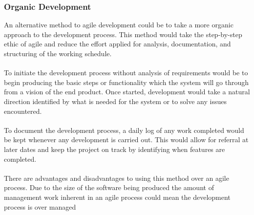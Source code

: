 		\subsubsection{Organic Development}
			An alternative method to agile development could be to take a more organic approach to the development process. This method would take the step-by-step ethic of agile and reduce the effort applied for analysis, documentation, and structuring of the working schedule.
			\\\\
			To initiate the development process without analysis of requirements would be to begin producing the basic steps or functionality which the system will go through from a vision of the end product. Once started, development would take a natural direction identified by what is needed for the system or to solve any issues encountered.
			\\\\
			To document the development process, a daily log of any work completed would be kept whenever any development is carried out. This would allow for referral at later dates and keep the project on track by identifying when features are completed.
			\\\\
			There are advantages and disadvantages to using this method over an agile process. Due to the size of the software being produced the amount of management work inherent in an agile process could mean the development process is over managed
